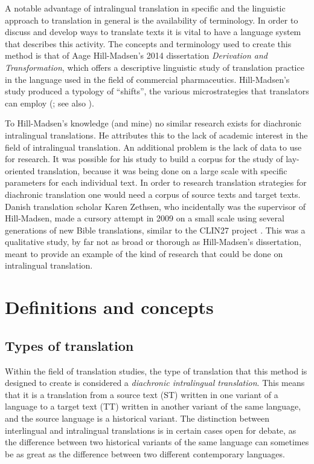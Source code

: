 \begin{paper}
A notable advantage of intralingual translation in specific and the
linguistic approach to translation in general is the availability of
terminology. In order to discuss and develop ways to translate texts it
is vital to have a language system that describes this activity. The
concepts and terminology used to create this method is that of Aage
Hill-Madsen's 2014 dissertation \emph{Derivation and Transformation}, which
offers a descriptive linguistic study of translation practice in the
language used in the field of commercial pharmaceutics. Hill-Madsen's
study produced a typology of ``shifts'', the various microstrategies that
translators can employ (\citealt[134]{hill-madsen_derivation_2014}; see also \citealt[269]{baker_routledge_2009}).

To Hill-Madsen's knowledge (and mine) no similar research exists for
diachronic intralingual translations. He attributes this to the lack of
academic interest in the field of intralingual translation. An
additional problem is the lack of data to use for research. It was
possible for his study to build a corpus for the study of lay-oriented
translation, because it was being done on a large scale with specific
parameters for each individual text. In order to research translation
strategies for diachronic translation one would need a corpus of source
texts and target texts. Danish translation scholar Karen Zethsen, who
incidentally was the supervisor of Hill-Madsen, made a cursory attempt
in 2009 on a small scale using several generations of new Bible
translations, similar to the CLIN27 project \citep[797]{zethsen_intralingual_2009}. This
was a qualitative study, by far not as broad or thorough as
Hill-Madsen's dissertation, meant to provide an example of the kind of
research that could be done on intralingual translation.

\section{Definitions and concepts}

\subsection{Types of translation}

Within the field of translation studies, the type of translation that
this method is designed to create is considered a \emph{diachronic
intralingual translation}. This means that it is a translation from a
source text (ST) written in one variant of a language to a target text
(TT) written in another variant of the same language, and the source
language is a historical variant. The distinction between interlingual
and intralingual translations is in certain cases open for debate, as
the difference between two historical variants of the same language can
sometimes be as great as the difference between two different
contemporary languages.


\end{paper}
